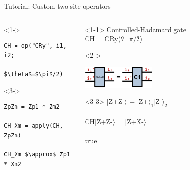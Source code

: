 \begin{frame}[fragile]{Tutorial: Custom two-site operators}

\begin{columns}

\begin{column}{5cm}

\begin{onlyenv}<1->
\begin{lstlisting}[language=JuliaLocal, style=julia, mathescape, basicstyle=\small]
CH = op("CRy", i1, i2;
             $\theta$=$\pi$/2)
\end{lstlisting}
\end{onlyenv}

\begin{onlyenv}<3->
\begin{lstlisting}[language=JuliaLocal, style=julia, mathescape, basicstyle=\small]
ZpZm = Zp1 * Zm2

CH_Xm = apply(CH, ZpZm)

CH_Xm $\approx$ Zp1 * Xm2
\end{lstlisting}
\end{onlyenv}

\end{column}

\begin{column}{5cm}

\begin{onlyenv}<1-1>
Controlled-Hadamard gate \\
CH = CRy($\theta$=$\pi$/2)
\end{onlyenv}

\begin{onlyenv}<2->
\vspace*{0.0cm}
\begin{center}
\includegraphics[width=0.2\textwidth]{
  slides/assets/CH12.png
}
\end{center}
\vspace*{0.0cm}
\end{onlyenv}

\begin{onlyenv}<3-3>
|Z+Z-$\rangle$ = |Z+$\rangle_1$|Z-$\rangle_2$ \\
~\\
CH|Z+Z-$\rangle$ = |Z+X-$\rangle$ \\
~\\
true
\end{onlyenv}


\end{column}
\end{columns}
\end{frame}
